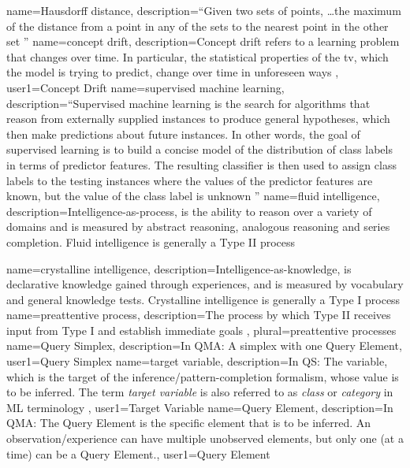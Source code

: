 {
  name=Hausdorff distance,
  description={``Given two sets of points, \dots the maximum of the distance from a point in any of the sets to the nearest point in the other set \citep{rote1991computing}''}
}
{
  name=concept drift,
  description={Concept drift refers to a learning problem that changes over time. In particular, the statistical properties of the \gls{tv}, which the model is trying to predict, change over time in unforeseen ways \citep{vzliobaite2010learning}},
  user1={Concept Drift}
}
{
  name=supervised machine learning,
  description={``Supervised machine learning is the search for algorithms that reason from externally supplied instances
to produce general hypotheses, which then make predictions about future instances. In other words, the
goal of supervised learning is to build a concise model of the distribution of class labels in terms of
predictor features. The resulting classifier is then used to assign class labels to the testing instances
where the values of the predictor features are known, but the value of the class label is unknown \citep{kotsiantis2007supervised}''}
}
{
  name=fluid intelligence,
  description={Intelligence-as-process, is the ability to reason over a variety of domains and is measured by abstract reasoning, analogous reasoning and series completion. Fluid intelligence is generally a \gls{Type II} process \citep{Stanovich2009IntTest}}
}

{
  name=crystalline intelligence,
  description={Intelligence-as-knowledge, is declarative knowledge gained through experiences, and is measured by vocabulary and general knowledge tests. Crystalline intelligence is generally a \gls{Type I} process \citep{Stanovich2009IntTest}}
}
{
  name=preattentive process,
  description={The process by which \gls{Type II} receives input from \gls{Type I} and establish immediate goals \citep{Stanovich2009IntTest}},
  plural={preattentive processes}
}
{
  name=Query Simplex,
  description={In QMA: A simplex with one \gls{Query Element}},
  user1={Query Simplex}
}
{
  name=target variable,
  description={In QS: The variable, which is the target of the inference/pattern-completion formalism, whose value is to be inferred. The term \emph{target variable} is also referred to as \emph{class} or \emph{category} in \gls{ML} terminology \citep{pang2006introduction}},
  user1={Target Variable}
}
{
  name=Query Element,
  description={In \gls{QMA}: The Query Element is the specific element that is to be inferred. An observation/experience can have multiple unobserved elements, but only one (at a time) can be a Query Element.},
  user1={Query Element}
}

